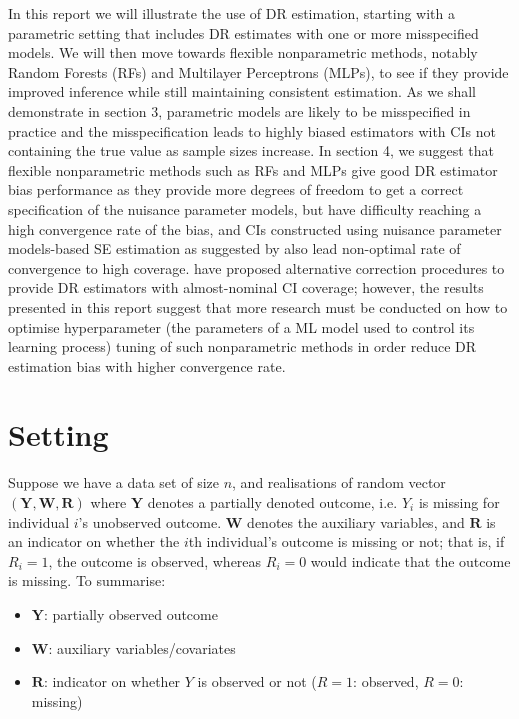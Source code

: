 \documentclass[12pt,twoside]{article}
\begin{document}
In this report we will illustrate the use of DR estimation, starting with a parametric setting that includes DR estimates with one or more misspecified models. We will then move towards flexible nonparametric methods, notably Random Forests (RFs) and Multilayer Perceptrons (MLPs), to see if they provide improved inference while still maintaining consistent estimation. As we shall demonstrate in section 3, parametric models are likely to be misspecified in practice and the misspecification leads to highly biased estimators with CIs not containing the true value as sample sizes increase. In section 4, we suggest that flexible nonparametric methods such as RFs and MLPs give good DR estimator bias performance as they provide more degrees of freedom to get a correct specification of the nuisance parameter models, but have difficulty reaching a high convergence rate of the bias, and CIs constructed using nuisance parameter models-based SE estimation as suggested by \cite{davidian} also lead non-optimal rate of convergence to high coverage. \cite{benkeser2017} have proposed alternative correction procedures to provide DR estimators with almost-nominal CI coverage; however, the results presented in this report suggest that more research must be conducted on how to optimise hyperparameter (the parameters of a ML model used to control its learning process) tuning of such nonparametric methods in order reduce DR estimation bias with higher convergence rate.


\section{Setting} 

Suppose we have a data set of size $n$, and realisations of random vector $(\mathbf{Y}, \mathbf{W}, \mathbf{R})$ where $\mathbf{Y}$ denotes a partially denoted outcome, i.e. $Y_i$ is missing for individual $i$'s unobserved outcome. $\mathbf{W}$ denotes the auxiliary variables, and $\mathbf{R}$ is an indicator on whether the $i$th individual's outcome is missing or not; that is, if $R_i = 1$, the outcome is observed, whereas $R_i = 0$ would indicate that the outcome is missing.
To summarise:
\begin{itemize}
    \item $\mathbf{Y}$: partially observed outcome 
    \item $\mathbf{W}$: auxiliary variables/covariates 
    \item $\mathbf{R}$: indicator on whether $Y$ is observed or not ($R = 1$: observed, $R = 0$: missing) 
\end{itemize}
\end{document}
